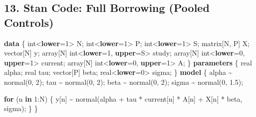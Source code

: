 \documentclass[
  letterpaper,
  DIV=11,
  numbers=noendperiod]{scrartcl}
\newenvironment{Shaded}{\begin{snugshade}}{\end{snugshade}}
\newcommand{\ControlFlowTok}[1]{\textcolor[rgb]{0.00,0.23,0.31}{\textbf{#1}}}
\newcommand{\DataTypeTok}[1]{\textcolor[rgb]{0.68,0.00,0.00}{#1}}
\newcommand{\DecValTok}[1]{\textcolor[rgb]{0.68,0.00,0.00}{#1}}
\newcommand{\FloatTok}[1]{\textcolor[rgb]{0.68,0.00,0.00}{#1}}
\newcommand{\KeywordTok}[1]{\textcolor[rgb]{0.00,0.23,0.31}{\textbf{#1}}}
\newcommand{\NormalTok}[1]{\textcolor[rgb]{0.00,0.23,0.31}{#1}}
\begin{document}
\subsection{13. Stan Code: Full Borrowing (Pooled
Controls)}\label{stan-code-full-borrowing-pooled-controls}

\begin{Shaded}
\begin{Highlighting}[]
\KeywordTok{data}\NormalTok{ \{}
  \DataTypeTok{int}\NormalTok{\textless{}}\KeywordTok{lower}\NormalTok{=}\DecValTok{1}\NormalTok{\textgreater{} N;}
  \DataTypeTok{int}\NormalTok{\textless{}}\KeywordTok{lower}\NormalTok{=}\DecValTok{1}\NormalTok{\textgreater{} P;}
  \DataTypeTok{int}\NormalTok{\textless{}}\KeywordTok{lower}\NormalTok{=}\DecValTok{1}\NormalTok{\textgreater{} S;}
  \DataTypeTok{matrix}\NormalTok{[N, P] X;}
  \DataTypeTok{vector}\NormalTok{[N] y;}
  \DataTypeTok{array}\NormalTok{[N] }\DataTypeTok{int}\NormalTok{\textless{}}\KeywordTok{lower}\NormalTok{=}\DecValTok{1}\NormalTok{, }\KeywordTok{upper}\NormalTok{=S\textgreater{} study;}
  \DataTypeTok{array}\NormalTok{[N] }\DataTypeTok{int}\NormalTok{\textless{}}\KeywordTok{lower}\NormalTok{=}\DecValTok{0}\NormalTok{, }\KeywordTok{upper}\NormalTok{=}\DecValTok{1}\NormalTok{\textgreater{} current;}
  \DataTypeTok{array}\NormalTok{[N] }\DataTypeTok{int}\NormalTok{\textless{}}\KeywordTok{lower}\NormalTok{=}\DecValTok{0}\NormalTok{, }\KeywordTok{upper}\NormalTok{=}\DecValTok{1}\NormalTok{\textgreater{} A;}
\NormalTok{\}}
\KeywordTok{parameters}\NormalTok{ \{}
  \DataTypeTok{real}\NormalTok{ alpha;}
  \DataTypeTok{real}\NormalTok{ tau;}
  \DataTypeTok{vector}\NormalTok{[P] beta;}
  \DataTypeTok{real}\NormalTok{\textless{}}\KeywordTok{lower}\NormalTok{=}\DecValTok{0}\NormalTok{\textgreater{} sigma;}
\NormalTok{\}}
\KeywordTok{model}\NormalTok{ \{}
\NormalTok{  alpha \textasciitilde{} normal(}\DecValTok{0}\NormalTok{, }\DecValTok{2}\NormalTok{);}
\NormalTok{  tau   \textasciitilde{} normal(}\DecValTok{0}\NormalTok{, }\DecValTok{2}\NormalTok{);}
\NormalTok{  beta  \textasciitilde{} normal(}\DecValTok{0}\NormalTok{, }\DecValTok{2}\NormalTok{);}
\NormalTok{  sigma \textasciitilde{} normal(}\DecValTok{0}\NormalTok{, }\FloatTok{1.5}\NormalTok{);}

  \ControlFlowTok{for}\NormalTok{ (n }\ControlFlowTok{in} \DecValTok{1}\NormalTok{:N) \{}
\NormalTok{    y[n] \textasciitilde{} normal(alpha + tau * current[n] * A[n] + X[n] * beta, sigma);}
\NormalTok{  \}}
\NormalTok{\}}
\end{Highlighting}
\end{Shaded}
\end{document}
